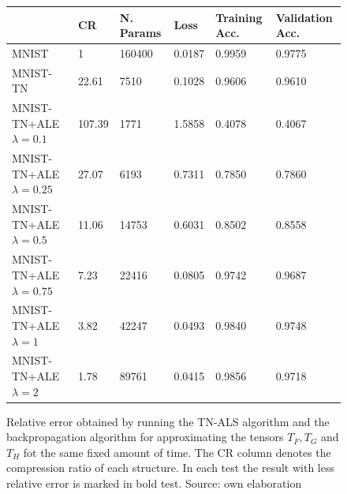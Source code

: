 \documentclass[11pt,a4paper,openright,oneside]{book}
\numberwithin{equation}{section}
\begin{document}
{\begin{figure}[H]
    \centering
\renewcommand{\arraystretch}{1.25}
\begin{tabular}{llllll}
\hline
            & CR & N. Params & Loss & Training Acc. & Validation Acc. \\ \hline
    MNIST     & 1 & 160400 & 0.0187 & 0.9959 & 0.9775  \\
    MNIST-TN     & 22.61 & 7510 & 0.1028 & 0.9606 & 0.9610 \\ \hline
    MNIST-TN+ALE $\lambda = 0.1$ & 107.39 & 1771 & 1.5858 & 0.4078 & 0.4067 \\
    MNIST-TN+ALE $\lambda = 0.25$ & 27.07 & 6193 &  0.7311 & 0.7850 & 0.7860 \\
    MNIST-TN+ALE $\lambda = 0.5$ & 11.06 & 14753 & 0.6031 & 0.8502 & 0.8558 \\
    MNIST-TN+ALE $\lambda = 0.75$ & 7.23 & 22416 & 0.0805 & 0.9742 & 0.9687 \\
    MNIST-TN+ALE $\lambda = 1$ & 3.82 & 42247 & 0.0493 & 0.9840 & 0.9748 \\
    MNIST-TN+ALE $\lambda = 2$ & 1.78 & 89761 & 0.0415 & 0.9856 & 0.9718 \\
\end{tabular}

\caption{Relative error obtained by running the TN-ALS algorithm and the backpropagation algorithm for approximating
    the tensors $T_F, T_G$ and $T_H$ fot the same fixed amount of time. The CR column denotes the compression ratio of each structure.
In each test the result with less relative error is marked in bold test. Source: own elaboration}
\label{fig:ap-table-backprop}
\end{figure}

\begin{figure}
    \centering
\end{figure}}
\end{document}
